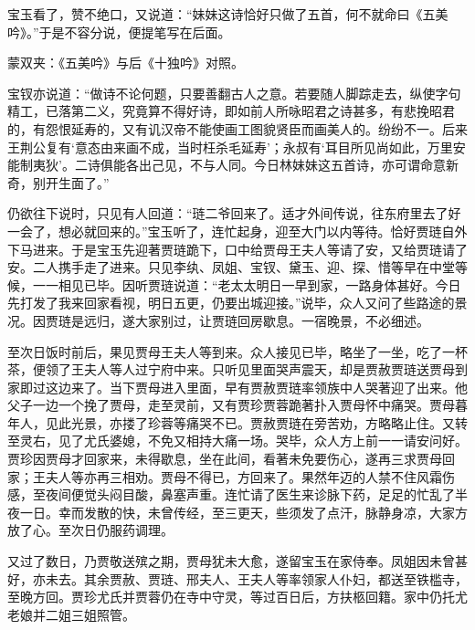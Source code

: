 \begin{parag}
    宝玉看了，赞不绝口，又说道：“妹妹这诗恰好只做了五首，何不就命曰《五美吟》。”于是不容分说，便提笔写在后面。\begin{note}蒙双夹：《五美吟》与后《十独吟》对照。\end{note}宝钗亦说道：“做诗不论何题，只要善翻古人之意。若要随人脚踪走去，纵使字句精工，已落第二义，究竟算不得好诗，即如前人所咏昭君之诗甚多，有悲挽昭君的，有怨恨延寿的，又有讥汉帝不能使画工图貌贤臣而画美人的。纷纷不一。后来王荆公复有‘意态由来画不成，当时枉杀毛延寿’；永叔有‘耳目所见尚如此，万里安能制夷狄’。二诗俱能各出己见，不与人同。今日林妹妹这五首诗，亦可谓命意新奇，别开生面了。”
\end{parag}


\begin{parag}
    仍欲往下说时，只见有人回道：“琏二爷回来了。适才外间传说，往东府里去了好一会了，想必就回来的。”宝玉听了，连忙起身，迎至大门以内等待。恰好贾琏自外下马进来。于是宝玉先迎著贾琏跪下，口中给贾母王夫人等请了安，又给贾琏请了安。二人携手走了进来。只见李纨、凤姐、宝钗、黛玉、迎、探、惜等早在中堂等候，一一相见已毕。因听贾琏说道：“老太太明日一早到家，一路身体甚好。今日先打发了我来回家看视，明日五更，仍要出城迎接。”说毕，众人又问了些路途的景况。因贾琏是远归，遂大家别过，让贾琏回房歇息。一宿晚景，不必细述。
\end{parag}


\begin{parag}
    至次日饭时前后，果见贾母王夫人等到来。众人接见已毕，略坐了一坐，吃了一杯茶，便领了王夫人等人过宁府中来。只听见里面哭声震天，却是贾赦贾琏送贾母到家即过这边来了。当下贾母进入里面，早有贾赦贾琏率领族中人哭著迎了出来。他父子一边一个挽了贾母，走至灵前，又有贾珍贾蓉跪著扑入贾母怀中痛哭。贾母暮年人，见此光景，亦搂了珍蓉等痛哭不已。贾赦贾琏在旁苦劝，方略略止住。又转至灵右，见了尤氏婆媳，不免又相持大痛一场。哭毕，众人方上前一一请安问好。贾珍因贾母才回家来，未得歇息，坐在此间，看著未免要伤心，遂再三求贾母回家；王夫人等亦再三相劝。贾母不得已，方回来了。果然年迈的人禁不住风霜伤感，至夜间便觉头闷目酸，鼻塞声重。连忙请了医生来诊脉下药，足足的忙乱了半夜一日。幸而发散的快，未曾传经，至三更天，些须发了点汗，脉静身凉，大家方放了心。至次日仍服药调理。
\end{parag}


\begin{parag}
    又过了数日，乃贾敬送殡之期，贾母犹未大愈，遂留宝玉在家侍奉。凤姐因未曾甚好，亦未去。其余贾赦、贾琏、邢夫人、王夫人等率领家人仆妇，都送至铁槛寺，至晚方回。贾珍尤氏并贾蓉仍在寺中守灵，等过百日后，方扶柩回籍。家中仍托尤老娘并二姐三姐照管。
\end{parag}


